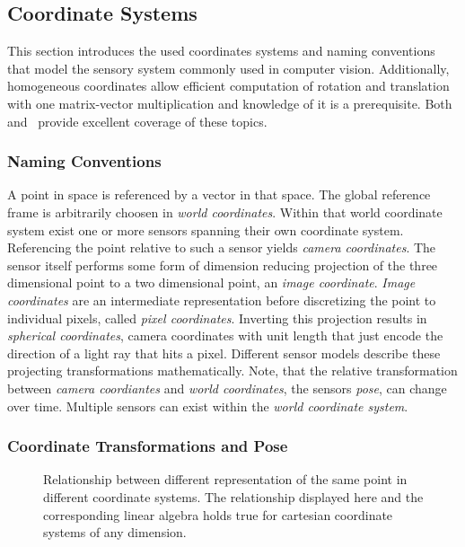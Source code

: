\subsection{Coordinate Systems}

This section introduces the used coordinates systems and naming conventions that model the sensory system commonly used in computer vision.
Additionally, homogeneous coordinates allow efficient computation of rotation and translation with one matrix-vector multiplication and knowledge of it is a prerequisite.
Both~\cite{hartley_2004} and~\cite{corke_2011} provide excellent coverage of these topics.

\subsubsection*{Naming Conventions}

A point in space is referenced by a vector in that space.
The global reference frame is arbitrarily choosen in \emph{world coordinates}.
Within that world coordinate system exist one or more sensors spanning their own coordinate system.
Referencing the point relative to such a sensor yields \emph{camera coordinates}.
The sensor itself performs some form of dimension reducing projection of the three dimensional point to a two dimensional point, an \emph{image coordinate}.
\emph{Image coordinates} are an intermediate representation before discretizing the point to individual pixels, called \emph{pixel coordinates}.
Inverting this projection results in \emph{spherical coordinates}, camera coordinates with unit length that just encode the direction of a light ray that hits a pixel.
Different sensor models describe these projecting transformations mathematically.
Note, that the relative transformation between \emph{camera coordiantes} and \emph{world coordinates}, the sensors \emph{pose}, can change over time.
Multiple sensors can exist within the \emph{world coordinate system}.

\subsubsection*{Coordinate Transformations and Pose}

\begin{figure}[H]
    \scalebox{0.8}{%
    
    }
    \caption[Coordinate Transformation]{Relationship between different representation of the same point in different coordinate systems. The relationship displayed here and the corresponding linear algebra holds true for cartesian coordinate systems of any dimension.}
\end{figure}

